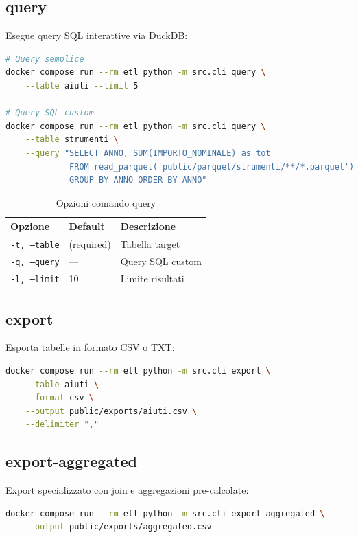 \subsection{query}

Esegue query SQL interattive via DuckDB:

\begin{lstlisting}[language=bash]
# Query semplice
docker compose run --rm etl python -m src.cli query \
    --table aiuti --limit 5

# Query SQL custom
docker compose run --rm etl python -m src.cli query \
    --table strumenti \
    --query "SELECT ANNO, SUM(IMPORTO_NOMINALE) as tot 
             FROM read_parquet('public/parquet/strumenti/**/*.parquet') 
             GROUP BY ANNO ORDER BY ANNO"
\end{lstlisting}

\begin{table}[h]
\centering
\begin{tabular}{@{}llp{5cm}@{}}
\toprule
\textbf{Opzione} & \textbf{Default} & \textbf{Descrizione} \\
\midrule
\texttt{-t, --table} & (required) & Tabella target \\
\texttt{-q, --query} & — & Query SQL custom \\
\texttt{-l, --limit} & 10 & Limite risultati \\
\bottomrule
\end{tabular}
\caption{Opzioni comando query}
\end{table}

\subsection{export}

Esporta tabelle in formato CSV o TXT:

\begin{lstlisting}[language=bash]
docker compose run --rm etl python -m src.cli export \
    --table aiuti \
    --format csv \
    --output public/exports/aiuti.csv \
    --delimiter ","
\end{lstlisting}

\subsection{export-aggregated}

Export specializzato con join e aggregazioni pre-calcolate:

\begin{lstlisting}[language=bash]
docker compose run --rm etl python -m src.cli export-aggregated \
    --output public/exports/aggregated.csv
\end{lstlisting}


